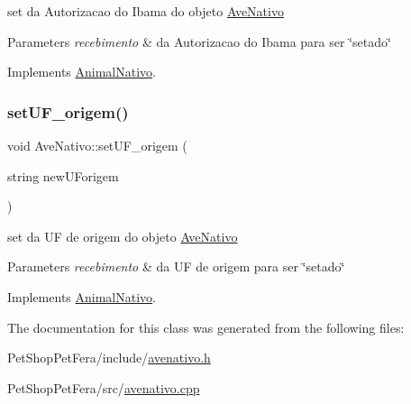 set da Autorizacao do Ibama do objeto \mbox{\hyperlink{class_ave_nativo}{Ave\+Nativo}} 


\begin{DoxyParams}{Parameters}
{\em recebimento} & da Autorizacao do Ibama para ser \char`\"{}setado\char`\"{} \\
\hline
\end{DoxyParams}


Implements \mbox{\hyperlink{class_animal_nativo_a1af7e01f35c5df788dd898136975eb49}{Animal\+Nativo}}.

\mbox{\label{class_ave_nativo_a286361965905e5f01dc36d849031381f}} 
\subsubsection{\texorpdfstring{setUF\_origem()}{setUF\_origem()}}
{\footnotesize\ttfamily void Ave\+Nativo\+::set\+U\+F\+\_\+origem (\begin{DoxyParamCaption}\item[{string}]{new\+U\+Forigem }\end{DoxyParamCaption})\hspace{0.3cm}{\ttfamily [virtual]}}



set da UF de origem do objeto \mbox{\hyperlink{class_ave_nativo}{Ave\+Nativo}} 


\begin{DoxyParams}{Parameters}
{\em recebimento} & da UF de origem para ser \char`\"{}setado\char`\"{} \\
\hline
\end{DoxyParams}


Implements \mbox{\hyperlink{class_animal_nativo}{Animal\+Nativo}}.



The documentation for this class was generated from the following files\+:\begin{DoxyCompactItemize}
\item 
Pet\+Shop\+Pet\+Fera/include/\mbox{\hyperlink{avenativo_8h}{avenativo.\+h}}\item 
Pet\+Shop\+Pet\+Fera/src/\mbox{\hyperlink{avenativo_8cpp}{avenativo.\+cpp}}\end{DoxyCompactItemize}
